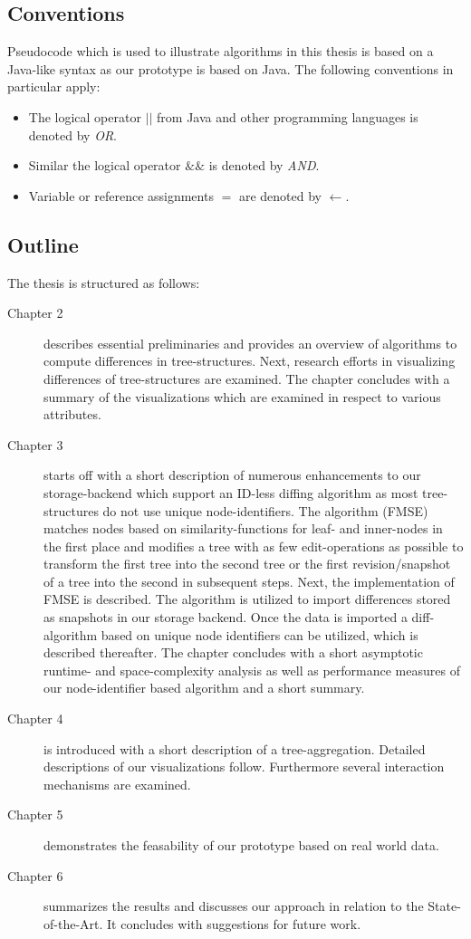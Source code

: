 \subsection{Conventions}
Pseudocode which is used to illustrate algorithms in this thesis is based on a Java-like syntax as our prototype is based on Java. The following conventions in particular apply:

\begin{itemize}
\item The logical operator \emph{$||$} from Java and other programming languages is denoted by \emph{OR}.
\item Similar the logical operator \emph{$\&\&$} is denoted by \emph{AND}.
\item Variable or reference assignments \emph{$=$} are denoted by \emph{$\leftarrow$}.
\end{itemize}

\subsection{Outline}
The thesis is structured as follows:

\begin{description}
\item[Chapter 2] describes essential preliminaries and provides an overview of algorithms to compute differences in tree-structures. Next, research efforts in visualizing differences of tree-structures are examined. The chapter concludes with a summary of the visualizations which are examined in respect to various attributes.
\item[Chapter 3] starts off with a short description of numerous enhancements to our storage-backend which support an ID-less diffing algorithm as most tree-structures do not use unique node-identifiers. The algorithm (FMSE) matches nodes based on similarity-functions for leaf- and inner-nodes in the first place and modifies a tree with as few edit-operations as possible to transform the first tree into the second tree or the first revision/snapshot of a tree into the second in subsequent steps. Next, the implementation of FMSE is described. The algorithm is utilized to import differences stored as snapshots in our storage backend. Once the data is imported a diff-algorithm based on unique node identifiers can be utilized, which is described thereafter. The chapter concludes with a short asymptotic runtime- and space-complexity analysis as well as performance measures of our node-identifier based algorithm and a short summary.
\item[Chapter 4] is introduced with a short description of a tree-aggregation. Detailed descriptions of our visualizations follow. Furthermore several interaction mechanisms are examined.
\item[Chapter 5] demonstrates the feasability of our prototype based on real world data.
\item[Chapter 6] summarizes the results and discusses our approach in relation to the State-of-the-Art. It concludes with suggestions for future work.
\end{description}


